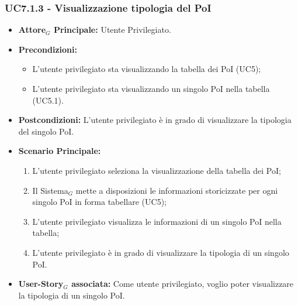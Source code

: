 \documentclass[10pt]{article}
\begin{document}
\begin{justify}
\subsubsection{\textbf{UC7.1.3 - Visualizzazione tipologia del PoI}}
\label{UC7.1.3}
\begin{itemize}
    \item \textbf{Attore$_G$ Principale:} Utente Privilegiato.
    \item \textbf{Precondizioni:} 
        \begin{itemize}
          \item L'utente privilegiato sta visualizzando la tabella dei PoI (UC5);
            \item L'utente privilegiato sta visualizzando un singolo PoI nella tabella (UC5.1).
        \end{itemize}
      \item \textbf{Postcondizioni:} L'utente privilegiato è in grado di visualizzare la tipologia del singolo PoI.
    \item \textbf{Scenario Principale:} 
        \begin{enumerate}
        \item L'utente privilegiato seleziona la visualizzazione della tabella dei PoI;
          \item Il Sistema$_G$ mette a disposizioni le informazioni storicizzate per ogni singolo PoI in forma tabellare (UC5);
          \item L'utente privilegiato visualizza le informazioni di un singolo PoI nella tabella;
            \item L'utente privilegiato è in grado di visualizzare la tipologia di un singolo PoI.
        \end{enumerate}
    \item \textbf{User-Story$_G$ associata:} Come utente privilegiato, voglio poter visualizzare la tipologia di un singolo PoI.
\end{itemize}

\end{justify}
\end{document}
